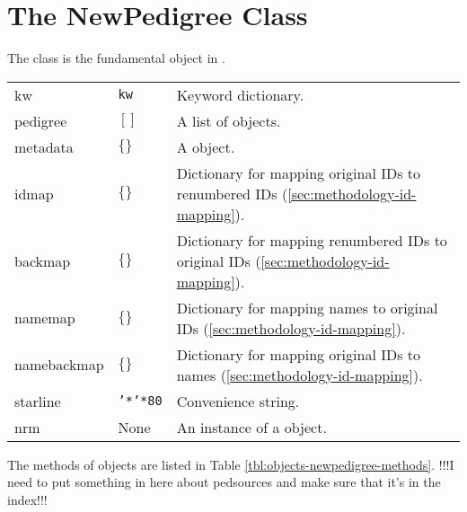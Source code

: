 \section{The NewPedigree Class}
\label{sec:objects-pedigree-objects}
The  class is the fundamental object in \PyPedal{}. 
\begin{center}
    \tablelasttail{\hline}
    \label{tbl:objects-newpedigree-attributes}
    \begin{xtabular}{l|l|p{4in}}
        kw & \texttt{kw} & Keyword dictionary. \\
	pedigree & $[]$ & A list of  objects. \\
        metadata & $\{\}$ & A  object. \\
        idmap & $\{\}$ & Dictionary for mapping original IDs to renumbered IDs (\ref{sec:methodology-id-mapping}). \\
        backmap & $\{\}$ & Dictionary for mapping renumbered IDs to original IDs (\ref{sec:methodology-id-mapping}). \\
        namemap & $\{\}$ & Dictionary for mapping names to original IDs (\ref{sec:methodology-id-mapping}). \\
        namebackmap & $\{\}$ & Dictionary for mapping original IDs to names (\ref{sec:methodology-id-mapping}). \\
        starline & \texttt{'*'*80} & Convenience string. \\
        nrm & None & An instance of a  object. \\
    \end{xtabular}
\end{center}
The methods of  objects are listed in Table \ref{tbl:objects-newpedigree-methods}. !!!I need to put something in here about pedsources and make sure that it's in the index!!!
